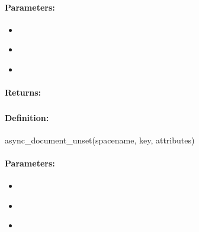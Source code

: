\paragraph{Parameters:}
\begin{itemize}[noitemsep]
\item {}\\

\item {}\\

\item {}\\

\end{itemize}

\paragraph{Returns:}


\pagebreak
\subsubsection{}
\label{api:ruby:async_document_unset}


\paragraph{Definition:}
\begin{rubycode}
async_document_unset(spacename, key, attributes)
\end{rubycode}

\paragraph{Parameters:}
\begin{itemize}[noitemsep]
\item {}\\

\item {}\\

\item {}\\

\end{itemize}


